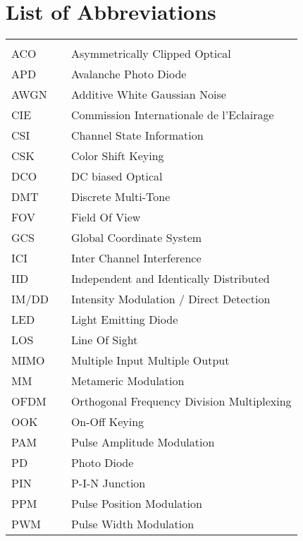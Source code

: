 \chapter*{List of Abbreviations}
\begin{center}
  \begin{longtable}{lll}
    \hspace*{2em} & \hspace*{1in} & \hspace*{4.5in} \\
    ACO & \dotfill & Asymmetrically Clipped Optical \\
		APD & \dotfill & Avalanche Photo Diode \\
		AWGN & \dotfill & Additive White Gaussian Noise \\
		CIE & \dotfill & Commission Internationale de l'Eclairage \\
		CSI & \dotfill & Channel State Information \\
		CSK & \dotfill & Color Shift Keying \\
		DCO & \dotfill & DC biased Optical \\
		DMT & \dotfill & Discrete Multi-Tone \\
		FOV & \dotfill & Field Of View \\
		GCS & \dotfill & Global Coordinate System \\
		ICI & \dotfill & Inter Channel Interference \\
		IID & \dotfill & Independent and Identically Distributed \\
		IM/DD & \dotfill & Intensity Modulation / Direct Detection \\
		LED & \dotfill & Light Emitting Diode \\
		LOS & \dotfill & Line Of Sight \\
		MIMO & \dotfill & Multiple Input Multiple Output \\
		MM & \dotfill & Metameric Modulation \\
		OFDM  & \dotfill & Orthogonal Frequency Division Multiplexing \\
		OOK & \dotfill & On-Off Keying \\
		PAM & \dotfill & Pulse Amplitude Modulation \\
		PD & \dotfill & Photo Diode \\
		PIN & \dotfill & P-I-N Junction \\
		PPM & \dotfill & Pulse Position Modulation \\
		PWM & \dotfill & Pulse Width Modulation \\

\end{longtable}
\end{center}

